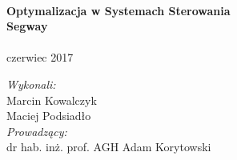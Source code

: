 \begin{titlepage}
\HRule \\[0.4cm]
{ \huge \bfseries Optymalizacja w Systemach Sterowania\\[1cm]Segway}\\[0.4cm] %
\HRule \\[2cm]%
 



{\large czerwiec 2017}\\[1.5cm] %



\begin{flushleft}
\Large
\emph{Wykonali:}\\
Marcin Kowalczyk\\
Maciej Podsiadło\\[1cm]

 \emph{Prowadzący:}\\
dr hab. inż. prof. AGH Adam Korytowski\\[3cm] %
 
\end{flushleft}
\end{titlepage}
\clearpage
\setcounter{page}{2}